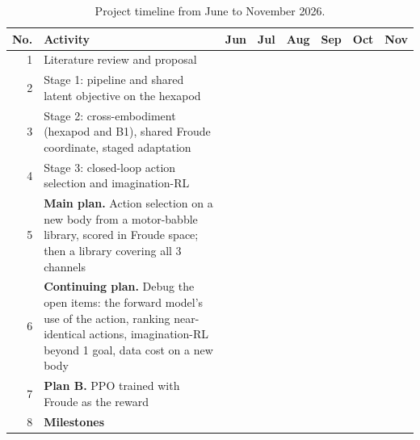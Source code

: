 \documentclass[12pt,a4paper,oneside]{report}
\begin{document}
\begin{table}[H]
\centering
\captionsetup{width=\linewidth, justification=centering}
\caption{Project timeline from June to November 2026.}
\label{tab:project-timeline-ours}
\vspace{0.2cm}
\footnotesize
\setlength{\tabcolsep}{1.5pt}
\renewcommand{\arraystretch}{1.6}
\begin{tabular}{|N|p{5.7cm}|*{6}{M|}}
\hline
{}
\textbf{No.} & \textbf{Activity}
 & \textbf{Jun} & \textbf{Jul} & \textbf{Aug} & \textbf{Sep} & \textbf{Oct} & \textbf{Nov} \\
\hline

1 & Literature review and proposal
 &  &  & & & & \\
\hline

2 & Stage 1: pipeline and shared latent objective on the hexapod
 & & &  & & & \\
\hline

3 & Stage 2: cross-embodiment (hexapod and B1), shared Froude coordinate,
    staged adaptation
 & & &  &  & & \\
\hline

4 & Stage 3: closed-loop action selection and imagination-RL
 & & &  &  & & \\
\hline

5 & \textbf{Main plan.} Action selection on a new body from a motor-babble
    library, scored in Froude space; then a library covering all 3 channels
 & & & &  &  &  \\
\hline

6 & \textbf{Continuing plan.} Debug the open items: the forward model's use of
    the action, ranking near-identical actions, imagination-RL beyond 1 goal,
    data cost on a new body
 & & & &  &  &  \\
\hline

7 & \textbf{Plan B.} PPO trained with Froude as the reward
 & & & &  &  &  \\
\hline

8 & \textbf{Milestones}
 & &  & &  & &  \\
\hline
\end{tabular}

\vspace{0.45cm}


\end{table}
\end{document}
